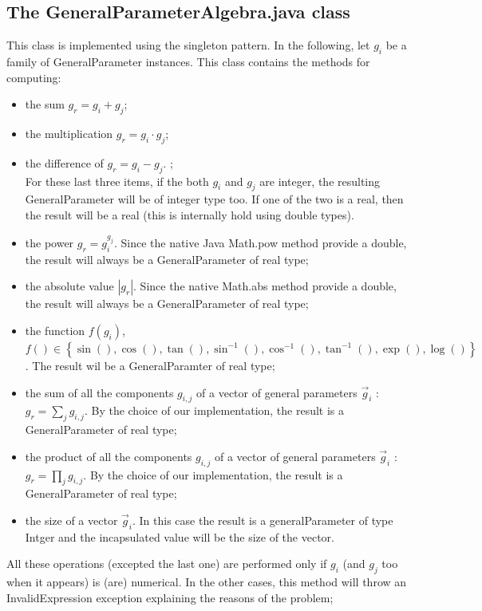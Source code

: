 \documentclass[a4paper,11pt] {ivoa}
\begin{document}
\subsection{The GeneralParameterAlgebra.java class}\label{gpalgebra}
This class is implemented using the singleton pattern. In the following, let $g_i$ be a family of GeneralParameter instances.
This class  contains the methods for computing:
\begin{itemize}
\item  the sum $g_r = g_i + g_j$;\\
\item the multiplication $g_r = g_i \cdot g_j$;\\
\item the difference of $g_r = g_i - g_j$. ;\\
For these last three items, if the both $g_i$ and $g_j$ are integer, the resulting GeneralParameter will be of integer type too. If one of the two is a real, then the result will be a real (this is internally hold using double types).\\
\item the power $g_r = g_i^{g_j}$. Since the native Java Math.pow method provide a double, the result will always 
be a GeneralParameter of real type;\\
\item the absolute value $|g_r|$. Since the native Math.abs method provide a double, the result will always be a GeneralParameter of real type;\\
\item the function $f(g_i)$, $\displaystyle f() \in \left\{ \sin() , \cos(), \tan(), \sin^{-1}(), \cos^{-1}(), \tan^{-1}(),  \exp(), \log() \right\}$. The result wil be a GeneralParamter of real type;
\item the sum of all the components $g_{i,j}$ of a vector of general parameters $\vec g_i$ : $g_r = \sum_j g_{i,j}$. By the choice of our implementation, the result is a GeneralParameter of real type;
\item the product of all the components $g_{i,j}$ of a vector of general parameters $\vec g_i$ : $g_r = \prod_j g_{i,j}$. By the choice of our implementation, the result is a GeneralParameter of real type;
\item the size of a vector $\vec g_i$. In this case the result is a generalParameter of type Intger and the incapsulated value will be the size of the vector.\\ 
\end{itemize} 
All  these operations (excepted the last one) are performed only if  $g_i$ (and $g_j$ too when it appears) is (are) numerical. In the other cases, this method will throw an InvalidExpression exception explaining the reasons of the problem;\\
\end{document}
